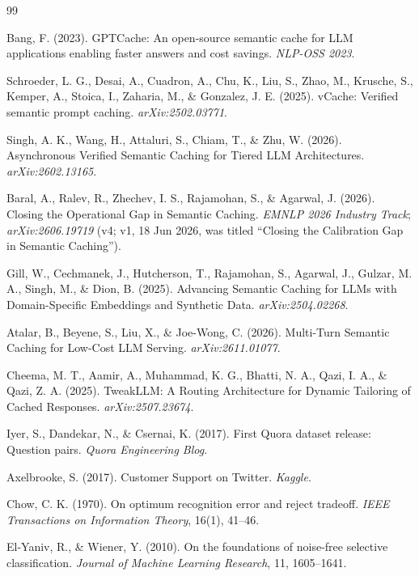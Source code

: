 \documentclass[11pt]{article}
\begin{document}
\begin{thebibliography}{99}

Bang, F. (2023). GPTCache: An open-source semantic cache for LLM applications enabling faster answers and cost savings. \textit{NLP-OSS 2023}.

Schroeder, L. G., Desai, A., Cuadron, A., Chu, K., Liu, S., Zhao, M., Krusche, S., Kemper, A., Stoica, I., Zaharia, M., \& Gonzalez, J. E. (2025). vCache: Verified semantic prompt caching. \textit{arXiv:2502.03771}.

Singh, A. K., Wang, H., Attaluri, S., Chiam, T., \& Zhu, W. (2026). Asynchronous Verified Semantic Caching for Tiered LLM Architectures. \textit{arXiv:2602.13165}.

Baral, A., Ralev, R., Zhechev, I. S., Rajamohan, S., \& Agarwal, J. (2026). Closing the Operational Gap in Semantic Caching. \textit{EMNLP 2026 Industry Track}; \textit{arXiv:2606.19719} (v4; v1, 18 Jun 2026, was titled ``Closing the Calibration Gap in Semantic Caching'').

Gill, W., Cechmanek, J., Hutcherson, T., Rajamohan, S., Agarwal, J., Gulzar, M. A., Singh, M., \& Dion, B. (2025). Advancing Semantic Caching for LLMs with Domain-Specific Embeddings and Synthetic Data. \textit{arXiv:2504.02268}.

Atalar, B., Beyene, S., Liu, X., \& Joe-Wong, C. (2026). Multi-Turn Semantic Caching for Low-Cost LLM Serving. \textit{arXiv:2611.01077}.

Cheema, M. T., Aamir, A., Muhammad, K. G., Bhatti, N. A., Qazi, I. A., \& Qazi, Z. A. (2025). TweakLLM: A Routing Architecture for Dynamic Tailoring of Cached Responses. \textit{arXiv:2507.23674}.

Iyer, S., Dandekar, N., \& Csernai, K. (2017). First Quora dataset release: Question pairs. \textit{Quora Engineering Blog}.

Axelbrooke, S. (2017). Customer Support on Twitter. \textit{Kaggle}.

Chow, C. K. (1970). On optimum recognition error and reject tradeoff. \textit{IEEE Transactions on Information Theory}, 16(1), 41--46.

El-Yaniv, R., \& Wiener, Y. (2010). On the foundations of noise-free selective classification. \textit{Journal of Machine Learning Research}, 11, 1605--1641.


\end{thebibliography}
\end{document}
